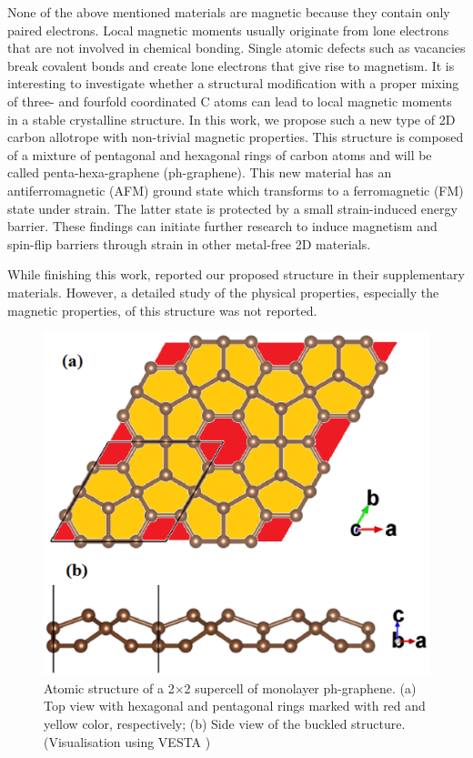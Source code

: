 None of the above mentioned materials are magnetic because they contain only paired electrons. Local magnetic moments usually originate from lone electrons that are not involved in chemical bonding. Single atomic defects such as vacancies break covalent bonds and create lone electrons that give rise to magnetism. It is interesting to investigate whether a structural modification with a proper mixing of three- and fourfold coordinated C atoms can lead to local magnetic moments in a stable crystalline structure.  In this work, we propose such a new type of 2D carbon allotrope with non-trivial magnetic properties. This structure is composed of a mixture of pentagonal and hexagonal rings of carbon atoms and will be called penta-hexa-graphene (ph-graphene). This new material has an antiferromagnetic (AFM) ground state which transforms to a ferromagnetic (FM) state under strain. The latter state is protected by a small strain-induced energy barrier. These findings can initiate further research to induce magnetism and spin-flip barriers through strain in other metal-free 2D materials.

While finishing this work, \citet{Zhang2016} reported our proposed structure in their supplementary materials. However, a detailed study of the physical properties, especially the magnetic properties, of this structure was not reported. 

\begin{figure}[htbp]
\centering
\includegraphics[width=0.6\linewidth]{PG_structure.eps}%
\caption{Atomic structure of a 2$\times$2 supercell of monolayer ph-graphene. (a) Top view with hexagonal and pentagonal rings marked with red and yellow color, respectively; (b) Side view of the buckled structure. \label{structure} (Visualisation using VESTA \cite{vesta})}
\end{figure}

